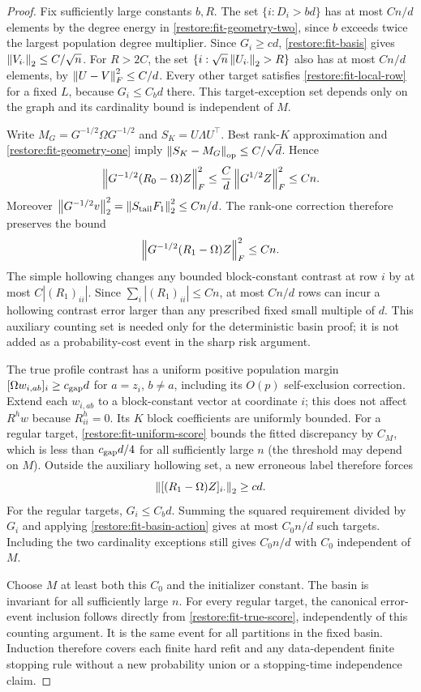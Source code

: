 \begin{proof}
Fix sufficiently large constants $b,R$. The set
$\{i:D_i>bd\}$ has at most $Cn/d$ elements by the degree energy in
\eqref{restore:fit-geometry-two}, since $b$ exceeds twice the largest
population degree multiplier. Since $G_i\ge cd$,
\eqref{restore:fit-basis} gives $\left\lVert V_{i\cdot}\right\rVert_2\le C/\sqrt n$.
For $R>2C$, the set $\{i:\sqrt n\left\lVert U_{i\cdot}\right\rVert_2>R\}$
also has at most $Cn/d$ elements, by
$\left\lVert U-V\right\rVert_F^2\le C/d$.
Every other target satisfies \eqref{restore:fit-local-row} for a
fixed $L$, because $G_i\le C_bd$ there.
This target-exception set depends only on the graph and its
cardinality bound is independent of $M$.

Write $M_G=G^{-1/2}\Omega G^{-1/2}$ and
$S_K=U\Lambda U^\top$. Best rank-$K$ approximation and
\eqref{restore:fit-geometry-one} imply
$\left\lVert S_K-M_G\right\rVert_{\mathrm{op}}\le C/\sqrt d$. Hence
\[
 \left\lVert G^{-1/2}(R_0-\Omega)Z\right\rVert_F^2
 \le \frac Cd\left\lVert G^{1/2}Z\right\rVert_F^2\le Cn.
\]
Moreover
$\left\lVert G^{-1/2}v\right\rVert_2^2
 =\left\lVert S_{\rm tail}F_1\right\rVert_2^2\le Cn/d$.
The rank-one correction therefore preserves the bound
\begin{equation}\label{restore:fit-basin-action}
 \left\lVert G^{-1/2}(R_1-\Omega)Z\right\rVert_F^2\le Cn.
\end{equation}
The simple hollowing changes any bounded block-constant contrast at
row $i$ by at most $C|(R_1)_{ii}|$.
Since $\sum_i|(R_1)_{ii}|\le Cn$, at most $Cn/d$ rows can incur
a hollowing contrast error larger than any prescribed fixed small
multiple of $d$.
This auxiliary counting set is needed only for the deterministic
basin proof; it is not added as a probability-cost event in the sharp
risk argument.

The true profile contrast has a uniform positive population margin
$[\Omega w_{i,ab}]_i\ge c_{\rm gap}d$ for $a=z_i$, $b\ne a$,
including its $O(p)$ self-exclusion correction.
Extend each $w_{i,ab}$ to a block-constant vector at coordinate $i$;
this does not affect $R^h w$ because $R^h_{ii}=0$.
Its $K$ block coefficients are uniformly bounded. For a regular
target, \cref{restore:fit-uniform-score} bounds the fitted discrepancy
by $C_M$, which is less than $c_{\rm gap}d/4$ for all sufficiently
large $n$ (the threshold may depend on $M$).
Outside the auxiliary hollowing set, a new erroneous label therefore
forces
\[
 \left\lVert[(R_1-\Omega)Z]_{i\cdot}\right\rVert_2\ge c d.
\]
For the regular targets, $G_i\le C_bd$. Summing the squared
requirement divided by $G_i$ and applying
\eqref{restore:fit-basin-action} gives at most $C_0n/d$ such targets.
Including the two cardinality exceptions still gives $C_0n/d$
with $C_0$ independent of $M$.

Choose $M$ at least both this $C_0$ and the initializer constant.
The basin is invariant for all sufficiently large $n$.
For every regular target, the canonical error-event inclusion
follows directly from \eqref{restore:fit-true-score}, independently
of this counting argument. It is the same event for all partitions
in the fixed basin. Induction therefore covers each finite hard
refit and any data-dependent finite stopping rule without a new
probability union or a stopping-time independence claim.
\end{proof}

